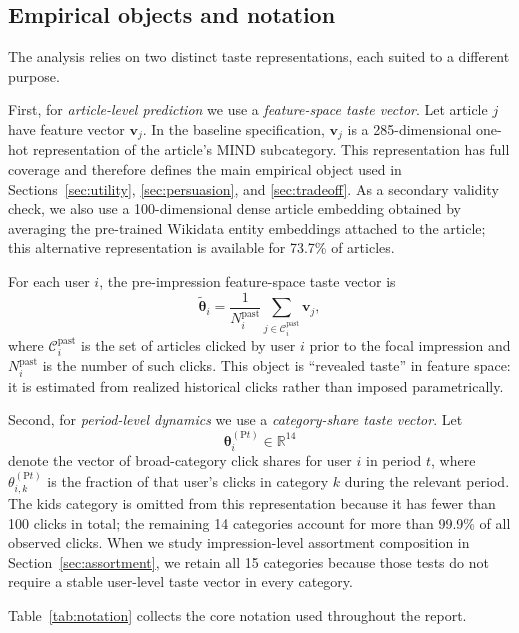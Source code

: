 \documentclass[11pt]{article}
\begin{document}
\subsection{Empirical objects and notation}
\label{sec:notation}

The analysis relies on two distinct taste representations, each suited to a different purpose.

First, for \emph{article-level prediction} we use a \emph{feature-space taste vector}. Let article $j$ have feature vector $\mathbf{v}_j$. In the baseline specification, $\mathbf{v}_j$ is a 285-dimensional one-hot representation of the article's MIND subcategory. This representation has full coverage and therefore defines the main empirical object used in Sections~\ref{sec:utility}, \ref{sec:persuasion}, and \ref{sec:tradeoff}. As a secondary validity check, we also use a 100-dimensional dense article embedding obtained by averaging the pre-trained Wikidata entity embeddings attached to the article; this alternative representation is available for 73.7\% of articles.

For each user $i$, the pre-impression feature-space taste vector is
\[
\tilde{\boldsymbol{\theta}}_i=\frac{1}{N_i^{\text{past}}}\sum_{j \in \mathcal{C}_i^{\text{past}}}\mathbf{v}_j,
\]
where $\mathcal{C}_i^{\text{past}}$ is the set of articles clicked by user $i$ prior to the focal impression and $N_i^{\text{past}}$ is the number of such clicks. This object is ``revealed taste'' in feature space: it is estimated from realized historical clicks rather than imposed parametrically.

Second, for \emph{period-level dynamics} we use a \emph{category-share taste vector}. Let
\[
\boldsymbol{\theta}_i^{(\mathrm{P}t)} \in \mathbb{R}^{14}
\]
denote the vector of broad-category click shares for user $i$ in period $t$, where $\theta_{i,k}^{(\mathrm{P}t)}$ is the fraction of that user's clicks in category $k$ during the relevant period. The kids category is omitted from this representation because it has fewer than 100 clicks in total; the remaining 14 categories account for more than 99.9\% of all observed clicks. When we study impression-level assortment composition in Section~\ref{sec:assortment}, we retain all 15 categories because those tests do not require a stable user-level taste vector in every category.

Table~\ref{tab:notation} collects the core notation used throughout the report.
\end{document}
